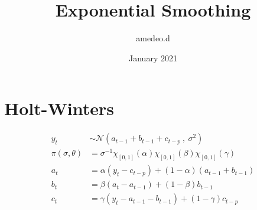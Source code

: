 \documentclass{article}
\title{Exponential Smoothing}
\author{amedeo.d }
\date{January 2021}
\begin{document}
\maketitle


\section{Holt-Winters}

\[ 
\begin{split}
y_t & \sim \mathcal{N} (a_{t-1} + b_{t-1} + c_{t-p} \ , \ \sigma^2) \\
\pi(\sigma, \theta) & = \sigma^{-1} \chi_{[0,1]}(\alpha)\chi_{[0,1]}(\beta)\chi_{[0,1]}(\gamma)    \\
a_t & = \alpha (y_t - c_{t-p}) + (1-\alpha)(a_{t-1} + b_{t-1}) \\
b_t & = \beta(a_t - a_{t-1}) + (1-\beta) b_{t-1} \\
c_t & = \gamma(y_t - a_{t-1} - b_{t-1}) + (1-\gamma)c_{t-p} \\
\end{split}
\]
\end{document}
